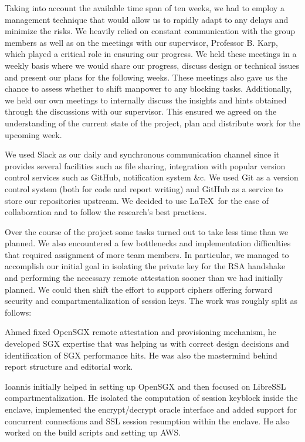 \documentclass[../main.tex]{subfiles}
\begin{document}
Taking into account the available time span of ten weeks, we had to employ a
management technique that would allow us to rapidly adapt to any delays and
minimize the risks. We heavily relied on constant communication with the group
members as well as on the meetings with our supervisor, Professor B. Karp, which
played a critical role in ensuring our progress. We held these meetings in a
weekly basis where we would share our progress, discuss design or technical
issues and present our plans for the following weeks. These meetings also gave
us the chance to assess whether to shift manpower to any blocking tasks.
Additionally, we held our own meetings to internally discuss the insights and
hints obtained through the discussions with our supervisor. This ensured we agreed
on the understanding of the current state of the project, plan and distribute work
for the upcoming week.

We used Slack as our daily and synchronous communication channel since it
provides several facilities such as file sharing, integration with popular
version control services such as GitHub, notification system \&c. We used
Git as a version control system (both for code and report writing) and GitHub
as a service to store our repositories upstream. We decided to use \LaTeX~for
the ease of collaboration and to follow the research’s best practices.

Over the course of the project some tasks turned out to take less time than we
planned. We also encountered a few bottlenecks and implementation
difficulties that required assignment of more team members. In particular, we
managed to accomplish our initial goal in isolating the private key for the RSA
handshake and performing the necessary remote attestation sooner than we had
initially planned. We could then shift the effort to support ciphers offering
forward security and compartmentalization of session keys. The work was roughly
split as follows:

Ahmed fixed OpenSGX remote attestation and provisioning mechanism, he
developed SGX expertise that was helping us with correct design decisions and
identification of SGX performance hits. He was also the mastermind behind
report structure and editorial work.

Ioannis initially helped in setting up OpenSGX and then focused on LibreSSL
compartmentalization. He isolated the computation of session keyblock inside
the enclave, implemented the encrypt/decrypt oracle interface and added support
for concurrent connections and SSL session resumption within the enclave. He
also worked on the build scripts and setting up AWS.
\end{document}
